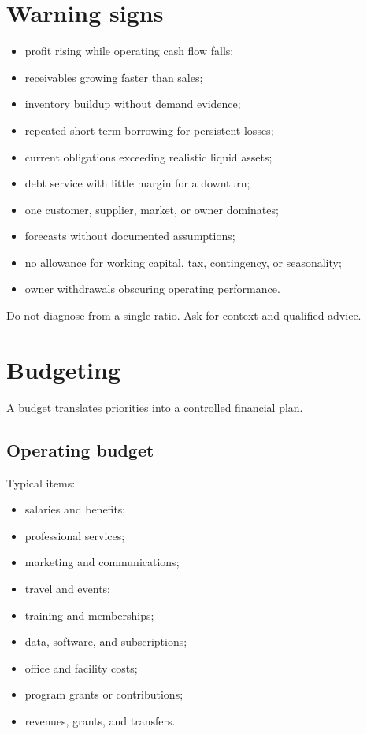 \documentclass[11pt,letterpaper,oneside,openany]{book}
\begin{document}
\section[Warning signs]{Warning signs}
\begin{itemize}
\item profit rising while operating cash flow falls;
\item receivables growing faster than sales;
\item inventory buildup without demand evidence;
\item repeated short-term borrowing for persistent losses;
\item current obligations exceeding realistic liquid assets;
\item debt service with little margin for a downturn;
\item one customer, supplier, market, or owner dominates;
\item forecasts without documented assumptions;
\item no allowance for working capital, tax, contingency, or seasonality;
\item owner withdrawals obscuring operating performance.
\end{itemize}


Do not diagnose from a single ratio. Ask for context and qualified advice.


\section[Budgeting]{Budgeting}
A budget translates priorities into a controlled financial plan.


\subsection[Operating budget]{Operating budget}
Typical items:


\begin{itemize}
\item salaries and benefits;
\item professional services;
\item marketing and communications;
\item travel and events;
\item training and memberships;
\item data, software, and subscriptions;
\item office and facility costs;
\item program grants or contributions;
\item revenues, grants, and transfers.
\end{itemize}
\end{document}

